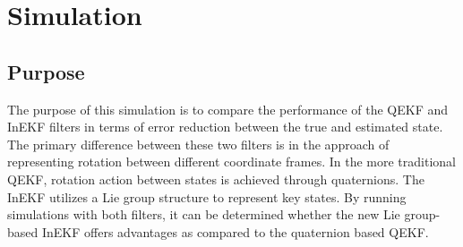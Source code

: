 \section{Simulation}

\subsection{Purpose}
The purpose of this simulation is to compare the performance of the QEKF and InEKF filters in terms of error reduction between the true and estimated state. The primary difference between these two filters is in the approach of representing rotation between different coordinate frames. In the more traditional QEKF, rotation action between states is achieved through quaternions. The InEKF utilizes a Lie group structure to represent key states. By running simulations with both filters, it can be determined whether the new Lie group-based InEKF offers advantages as compared to the quaternion based QEKF.

